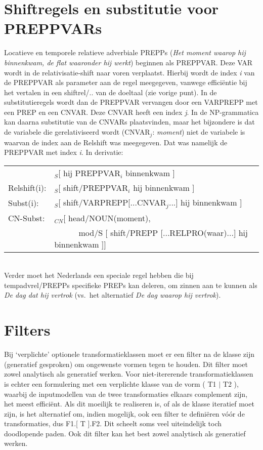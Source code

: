 \section{Shiftregels en substitutie voor PREPPVARs}
Locatieve en temporele relatieve adverbiale PREPPs ({\em Het moment waarop hij 
binnenkwam, 
de flat waaronder hij werkt\/}) beginnen als PREPPVAR. Deze VAR wordt in de 
relativisatie-shift naar voren verplaatst. Hierbij wordt de index {\em i\/} van 
de 
PREPPVAR als parameter aan de regel meegegeven, vanwege effici\"{e}ntie bij het 
vertalen in een shiftrel/.. van de doeltaal (zie vorige punt). In de 
substitutieregels wordt 
dan de 
PREPPVAR vervangen door een VARPREPP met een PREP en een CNVAR. Deze CNVAR 
heeft een index {\em j\/}. In de NP-grammatica kan daarna substitutie van de 
CNVARs plaatsvinden, maar het bijzondere is dat de variabele die 
gerelativiseerd wordt (CNVAR$_{j}$: {\em moment\/}) niet de variabele is 
waarvan de index aan de Relshift was meegegeven. Dat was namelijk de PREPPVAR 
met index {\em i\/}. In derivatie:\\[5 mm]
\begin{tabular}{ll}
              &   $_{S}$[ hij PREPPVAR$_{i}$ binnenkwam ] \\
Relshift(i):  &   $_{S}$[ shift/PREPPVAR$_{i}$ hij binnenkwam ] \\
Subst(i):     &   $_{S}$[ shift/VARPREPP[...CNVAR$_{j}$...] hij binnenkwam ] \\
CN-Subst:     &   $_{CN}$[ head/NOUN(moment), \\
              & \ \ \ \ \ \ mod/S [ shift/PREPP [...RELPRO(waar)...] hij 
                                                                binnenkwam ]]
\end{tabular}
\\[5 mm]
Verder moet het Nederlands een speciale regel hebben die bij tempadvrel/PREPPs 
specifieke PREPs kan deleren, om zinnen aan te kunnen als {\em De dag dat hij 
vertrok\/} 
(vs.\ het alternatief {\em De dag waarop hij vertrok\/}).

\section{Filters}
Bij `verplichte' optionele transformatieklassen moet er een
filter na de klasse zijn (generatief gesproken) om ongewenste vormen tegen te
houden. Dit filter moet zowel analytisch als generatief werken. Voor
niet-itererende transformatieklassen is echter een formulering met een
verplichte klasse van de vorm ( T1 $|$ T2 ), waarbij de inputmodellen van de
twee transformaties elkaars complement zijn, het meest effici\"{e}nt. Als dit
moeilijk te realiseren is, of als de klasse iteratief moet zijn, is het
alternatief om, indien mogelijk, ook een filter te defini\"{e}ren v\'{o}\'{o}r
de transformaties, dus F1.[ T ].F2. Dit scheelt soms 
veel uiteindelijk toch doodlopende paden. Ook dit filter kan het best zowel
analytisch als generatief werken. 

